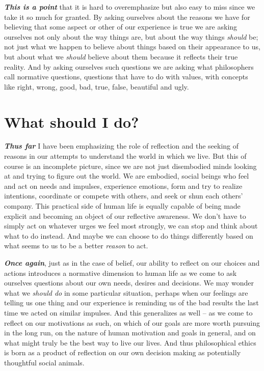 \documentclass[12pt, openany]{book}
\begin{document}
\textbf{\emph{This is a point}} that it is hard to overemphasize but also easy to miss since we take it so much for granted. By asking ourselves about the reasons we have for believing that some aspect or other of our experience is true we are asking ourselves not only about the way things are, but about the way things \emph{should} be; not just what we happen to believe about things based on their appearance to us, but about what we \emph{should} believe about them because it reflects their true reality. And by asking ourselves such questions we are asking what philosophers call normative questions, questions that have to do with values, with concepts like right, wrong, good, bad, true, false, beautiful and ugly.

\hypertarget{what-should-i-do}{%
\section{What should I do?}\label{what-should-i-do}}

\textbf{\emph{Thus far}} I have been emphasizing the role of reflection and the seeking of reasons in our attempts to understand the world in which we live. But this of course is an incomplete picture, since we are not just disembodied minds looking at and trying to figure out the world. We are embodied, social beings who feel and act on needs and impulses, experience emotions, form and try to realize intentions, coordinate or compete with others, and seek or shun each others' company. This practical side of human life is equally capable of being made explicit and becoming an object of our reflective awareness. We don't have to simply act on whatever urges we feel most strongly, we can stop and think about what to do instead. And maybe we can choose to do things differently based on what seems to us to be a better \emph{reason} to act.

\textbf{\emph{Once again}}, just as in the case of belief, our ability to reflect on our choices and actions introduces a normative dimension to human life as we come to ask ourselves questions about our own needs, desires and decisions. We may wonder what we \emph{should do} in some particular situation, perhaps when our feelings are telling us one thing and our experience is reminding us of the bad results the last time we acted on similar impulses. And this generalizes as well -- as we come to reflect on our motivations as such, on which of our goals are more worth pursuing in the long run, on the nature of human motivation and goals in general, and on what might truly be the best way to live our lives. And thus philosophical ethics is born as a product of reflection on our own decision making as potentially thoughtful social animals.
\end{document}
